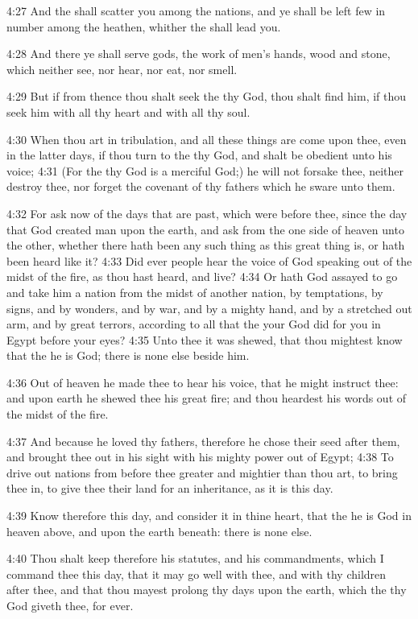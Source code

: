 4:27 And the \LORD shall scatter you among the nations, and ye shall be
left few in number among the heathen, whither the \LORD shall lead you.

4:28 And there ye shall serve gods, the work of men's hands, wood and
stone, which neither see, nor hear, nor eat, nor smell.

4:29 But if from thence thou shalt seek the \LORD thy God, thou shalt
find him, if thou seek him with all thy heart and with all thy soul.

4:30 When thou art in tribulation, and all these things are come upon
thee, even in the latter days, if thou turn to the \LORD thy God, and
shalt be obedient unto his voice; 4:31 (For the \LORD thy God is a
merciful God;) he will not forsake thee, neither destroy thee, nor
forget the covenant of thy fathers which he sware unto them.

4:32 For ask now of the days that are past, which were before thee,
since the day that God created man upon the earth, and ask from the
one side of heaven unto the other, whether there hath been any such
thing as this great thing is, or hath been heard like it?  4:33 Did
ever people hear the voice of God speaking out of the midst of the
fire, as thou hast heard, and live?  4:34 Or hath God assayed to go
and take him a nation from the midst of another nation, by
temptations, by signs, and by wonders, and by war, and by a mighty
hand, and by a stretched out arm, and by great terrors, according to
all that the \LORD your God did for you in Egypt before your eyes?
4:35 Unto thee it was shewed, that thou mightest know that the \LORD he
is God; there is none else beside him.

4:36 Out of heaven he made thee to hear his voice, that he might
instruct thee: and upon earth he shewed thee his great fire; and thou
heardest his words out of the midst of the fire.

4:37 And because he loved thy fathers, therefore he chose their seed
after them, and brought thee out in his sight with his mighty power
out of Egypt; 4:38 To drive out nations from before thee greater and
mightier than thou art, to bring thee in, to give thee their land for
an inheritance, as it is this day.

4:39 Know therefore this day, and consider it in thine heart, that the
\LORD he is God in heaven above, and upon the earth beneath: there is
none else.

4:40 Thou shalt keep therefore his statutes, and his commandments,
which I command thee this day, that it may go well with thee, and with
thy children after thee, and that thou mayest prolong thy days upon
the earth, which the \LORD thy God giveth thee, for ever.

